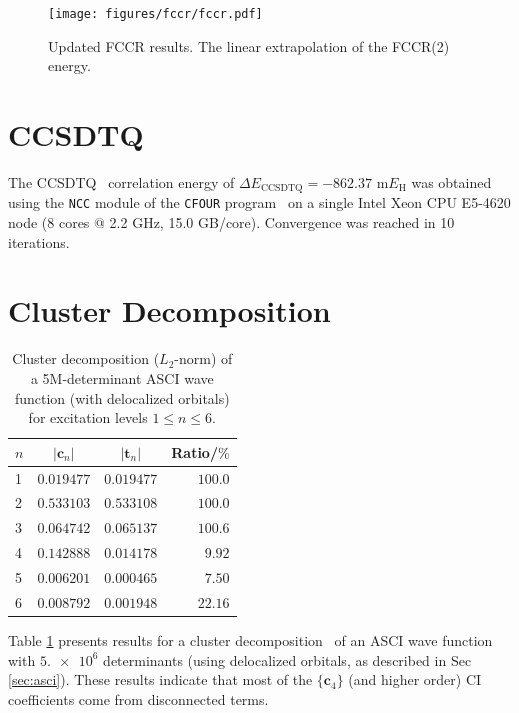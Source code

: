 \documentclass[journal=jcp,manuscript=suppinfo]{achemso}
\begin{document}
%
\begin{figure}[ht!]
\begin{center}
\texttt{[image: figures/fccr/fccr.pdf]}
\caption{Updated FCCR results. The linear extrapolation of the FCCR(2) energy.}
\label{fccr_updated_SI_fig}
\end{center}
\vspace{-0.6cm}
\end{figure}
%

\section{CCSDTQ}

The CCSDTQ~\cite{ccsdtq_paper_1_jcp_1991,ccsdtq_paper_2_jcp_1992} correlation energy of $\Delta E_{\text{CCSDTQ}} = -862.37$ m$E_{\text{H}}$ was obtained using the {\texttt{NCC}} module of the {\texttt{CFOUR}} program~\cite{matthews_stanton_ccsdtq_jcp_2015,ncc,cfour_paper,cfour} on a single Intel Xeon CPU E5-4620 node (8 cores $@$ 2.2 GHz, 15.0 GB/core). Convergence was reached in 10 iterations.

\section{Cluster Decomposition}

%
\begin{table}[ht!]
\begin{center}
\caption{Cluster decomposition ($L_2$-norm) of a 5M-determinant ASCI wave function (with delocalized orbitals) for excitation levels $1 \leq n \leq 6$.}
\label{cluster_decomp_SI_table}
\begin{tabular}{l|r|r|r}
\toprule
\multicolumn{1}{c|}{$n$} & \multicolumn{1}{c|}{$|\bm{c}_n|$} & \multicolumn{1}{c|}{$|\bm{t}_n|$} & \multicolumn{1}{c}{Ratio/$\%$} \\
\midrule\midrule
1 & $0.019477$ & $0.019477$ & $100.0$ \\
2 & $0.533103$ & $0.533108$ & $100.0$ \\
3 & $0.064742$ & $0.065137$ & $100.6$ \\
4 & $0.142888$ & $0.014178$ & $9.92$ \\
5 & $0.006201$ & $0.000465$ & $7.50$ \\
6 & $0.008792$ & $0.001948$ & $22.16$ \\
\midrule
\end{tabular}
\vspace{-0.6cm}
\end{center}
\end{table}
%
Table \ref{cluster_decomp_SI_table} presents results for a cluster decomposition~\cite{lehtola_head_gordon_fci_decomp_jcp_2017} of an ASCI wave function with $\num{5.e6}$ determinants (using delocalized orbitals, as described in Sec \ref{sec:asci}). These results indicate that most of the $\{\bm{c}_4\}$ (and higher order) CI coefficients come from disconnected terms.\\
\end{document}
